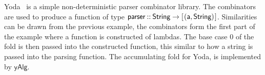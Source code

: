 \documentclass[a4paper, twocolumn, 10pt]{extarticle}
\newcommand\codeskip{\mskip\codemuskip}%
\let\codefont\textsf
\newcommand{\Conid}[1]{\mathit{#1}}
\newcommand{\Varid}[1]{\mathit{#1}}
\def\resethooks{%
  \global\let\SaveRestoreHook\empty
  \global\let\ColumnHook\empty}
\newcommand{\hsindent}[1]{\quad}%
\let\hspre\empty
\let\hspost\empty
\renewcommand\Varid[1]{\codefont{#1}}
\let\Conid\Varid
\begin{document}
\resethooks

Yoda~\cite{wuYoda} is a simple non-deterministic parser combinator library.
The combinators are used to produce a function of type \ensuremath{\Varid{parser}\mathbin{::}\Conid{String}\to [\mskip1.5mu (\Varid{a},\Conid{String})\mskip1.5mu]}.
Similarities can be drawn from the previous example, the combinators form the first part of the example where a function is constructed of lambdas.
The base case \ensuremath{\mathrm{0}} of the fold is then passed into the constructed function, this similar to how a string is passed into the parsing function.
The accumulating fold for Yoda, is implemented by \ensuremath{\Varid{yAlg}}.
\end{document}
